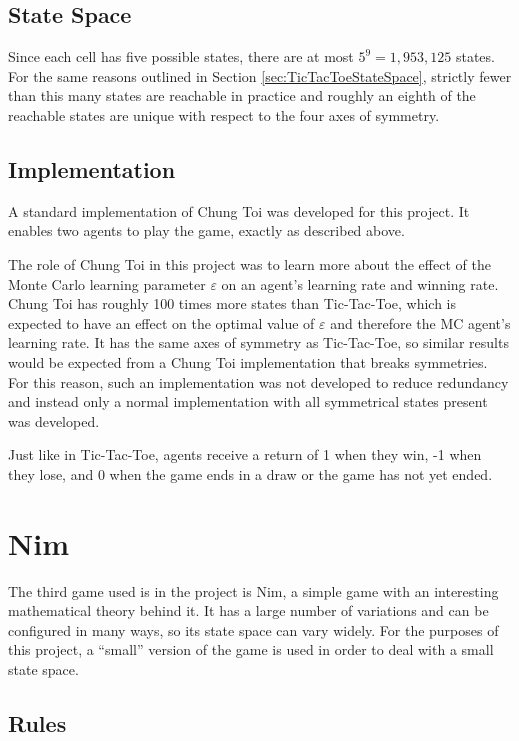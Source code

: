\documentclass[11pt,a4paper]{report}
\begin{document}
\subsection{State Space}

Since each cell has five possible states, there are at most $5^9 = 1,953,125$ states. For the same reasons outlined in Section \ref{sec:TicTacToeStateSpace}, strictly fewer than this many states are reachable in practice and roughly an eighth of the reachable states are unique with respect to the four axes of symmetry.


\subsection{Implementation}

A standard implementation of Chung Toi was developed for this project. It enables two agents to play the game, exactly as described above.

The role of Chung Toi in this project was to learn more about the effect of the Monte Carlo learning parameter $\varepsilon$ on an agent's learning rate and winning rate. Chung Toi has roughly 100 times more states than Tic-Tac-Toe, which is expected to have an effect on the optimal value of $\varepsilon$ and therefore the MC agent's learning rate. It has the same axes of symmetry as Tic-Tac-Toe, so similar results would be expected from a Chung Toi implementation that breaks symmetries. For this reason, such an implementation was not developed to reduce redundancy and instead only a normal implementation with all symmetrical states present was developed.

Just like in Tic-Tac-Toe, agents receive a return of 1 when they win, -1 when they lose, and 0 when the game ends in a draw or the game has not yet ended.


\section{Nim}
\label{sec:Nim}

The third game used is in the project is Nim, a simple game with an interesting mathematical theory behind it. It has a large number of variations and can be configured in many ways, so its state space can vary widely. For the purposes of this project, a ``small'' version of the game is used in order to deal with a small state space.


\subsection{Rules}
\end{document}
